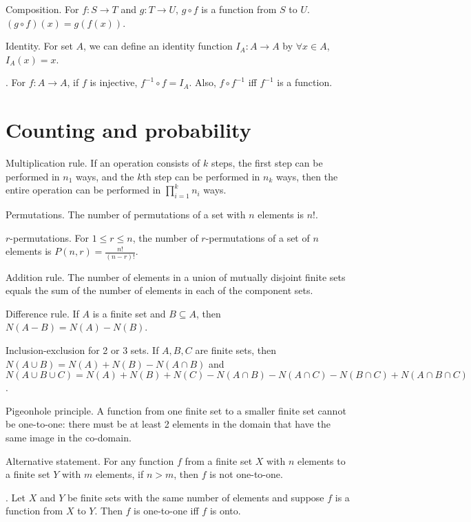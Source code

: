 \documentclass{slnotes}
\begin{document}
 Composition. For \(f : S \to T\) and \(g : T \to U\), \(g \circ f\) is a function from \(S\) to \(U\). \((g \circ f)(x) = g(f(x))\).

 Identity. For set \(A\), we can define an identity function \(I_A : A \to A\) by \(\forall x \in A\), \(I_A(x) = x\).

. For \(f : A \to A\), if \(f\) is injective, \(f^{-1} \circ f = I_A\). Also, \(f \circ f^{-1}\) iff \(f^{-1}\) is a function.

\chapter{Counting and probability}
 Multiplication rule. If an operation consists of \(k\) steps, the first step can be performed in \(n_1\) ways, and the \(k\)th step can be performed in \(n_k\) ways, then the entire operation can be performed in \(\prod^k_{i=1} n_i\) ways.

 Permutations. The number of permutations of a set with \(n\) elements is \(n!\).

 \(r\)-permutations. For \(1 \le r \le n\), the number of \(r\)-permutations of a set of \(n\) elements is \(P(n, r) = \frac{n!}{(n-r)!}\).

 Addition rule. The number of elements in a union of mutually disjoint finite sets equals the sum of the number of elements in each of the component sets.

 Difference rule. If \(A\) is a finite set and \(B \subseteq A\), then \(N(A - B) = N(A) - N(B)\).

 Inclusion-exclusion for 2 or 3 sets. If \(A, B, C\) are finite sets, then \(N(A \cup B) = N(A) + N(B) - N(A \cap B)\) and \(N(A \cup B \cup C) = N(A) + N(B) + N(C) - N(A \cap B) - N(A \cap C) - N(B \cap C) + N(A \cap B \cap C)\).

 Pigeonhole principle. A function from one finite set to a smaller finite set cannot be one-to-one: there must be at least 2 elements in the domain that have the same image in the co-domain.

Alternative statement. For any function \(f\) from a finite set \(X\) with \(n\) elements to a finite set \(Y\) with \(m\) elements, if \(n > m\), then \(f\) is not one-to-one.

. Let \(X\) and \(Y\) be finite sets with the same number of elements and suppose \(f\) is a function from \(X\) to \(Y\). Then \(f\) is one-to-one iff \(f\) is onto.
\end{document}

